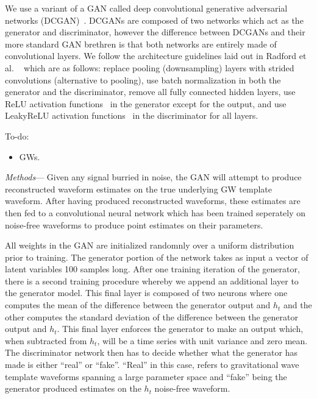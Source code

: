 \documentclass[%
showpacs,
 amsmath,amssymb,
 aps,
 twocolumn,
 prl,
 reprint,
floatfix,
]{revtex4-1}
\begin{document}
We use a variant of a GAN called deep convolutional generative adversarial
networks (DCGAN)~\cite{1511.06434}. DCGANs are composed of two networks which act as
the generator and discriminator, however the difference between DCGANs and their more standard
GAN brethren is that both networks are entirely made of
convolutional layers. We follow the architecture guidelines laid out in Radford et al.
~\cite{1511.06434} which are as follows: replace pooling (downsampling) layers with strided
convolutions (alternative to pooling),
use batch normalization in both the generator and the discriminator, remove all fully
connected hidden layers, use ReLU activation functions~\cite{Nair:2010:RLU:3104322.3104425}
in the generator except for the output,
and use LeakyReLU activation functions~\cite{Maas2013RectifierNI} in the discriminator for all layers.

To-do:

\begin{itemize}
\item GWs.
\end{itemize}

\textit{Methods}--- 
Given any signal burried in noise, the GAN will attempt to produce reconstructed waveform estimates on the true underlying GW template waveform. After having produced reconstructed waveforms, these estimates are then fed to a convolutional neural network which has been trained seperately on noise-free waveforms to produce point estimates on their parameters. 

All weights in the GAN are initialized randomnly over a uniform distribution prior to training. The generator portion of the network takes as input a vector of latent variables 100 samples long. After one training iteration of the generator, there is a second training procedure whereby we append an additional layer to the generator model. This final layer is composed of two neurons where one computes the mean of the difference between the generator output and $h_t$ and the other computes the standard deviation of the difference between the generator output and $h_t$. This final layer enforces the generator to make an output which, when subtracted from $h_t$, will be a time series with unit variance and zero mean. The discriminator network then has to decide whether what the generator has made is either ``real'' or ``fake''. ``Real'' in this case, refers to gravitational wave template waveforms spanning a large parameter space and ``fake'' being the generator produced estimates on the $h_t$ noise-free waveform. 
\end{document}

